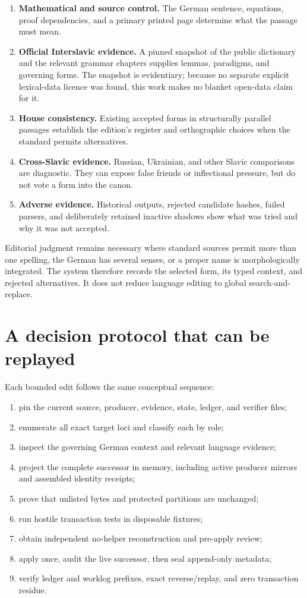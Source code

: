 \documentclass[11pt,a4paper]{article}
\begin{document}
\begin{enumerate}
  \item \textbf{Mathematical and source control.} The German sentence, equations, proof dependencies, and a primary printed page determine what the passage must mean.
  \item \textbf{Official Interslavic evidence.} A pinned snapshot of the public dictionary and the relevant grammar chapters supplies lemmas, paradigms, and governing forms. The snapshot is evidentiary; because no separate explicit lexical-data licence was found, this work makes no blanket open-data claim for it.
  \item \textbf{House consistency.} Existing accepted forms in structurally parallel passages establish the edition's register and orthographic choices when the standard permits alternatives.
  \item \textbf{Cross-Slavic evidence.} Russian, Ukrainian, and other Slavic comparisons are diagnostic. They can expose false friends or inflectional pressure, but do not vote a form into the canon.
  \item \textbf{Adverse evidence.} Historical outputs, rejected candidate hashes, failed parsers, and deliberately retained inactive shadows show what was tried and why it was not accepted.
\end{enumerate}

Editorial judgment remains necessary where standard sources permit more than one spelling, the German has several senses, or a proper name is morphologically integrated. The system therefore records the selected form, its typed context, and rejected alternatives. It does not reduce language editing to global search-and-replace.

\section{A decision protocol that can be replayed}

Each bounded edit follows the same conceptual sequence:

\begin{enumerate}
  \item pin the current source, producer, evidence, state, ledger, and verifier files;
  \item enumerate all exact target loci and classify each by role;
  \item inspect the governing German context and relevant language evidence;
  \item project the complete successor in memory, including active producer mirrors and assembled identity receipts;
  \item prove that unlisted bytes and protected partitions are unchanged;
  \item run hostile transaction tests in disposable fixtures;
  \item obtain independent no-helper reconstruction and pre-apply review;
  \item apply once, audit the live successor, then seal append-only metadata;
  \item verify ledger and worklog prefixes, exact reverse/replay, and zero transaction residue.
\end{enumerate}
\end{document}
